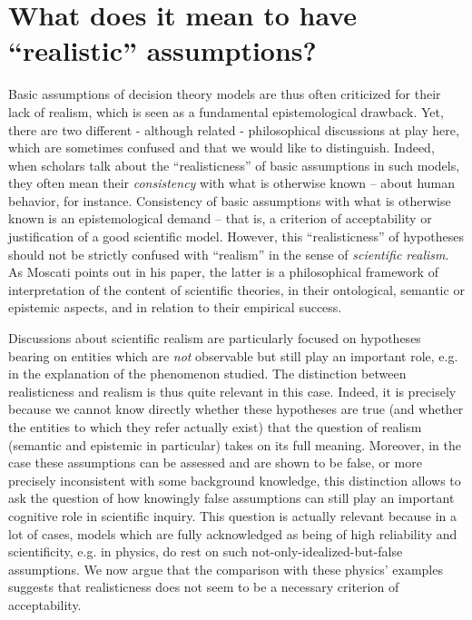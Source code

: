 \documentclass[a4paper,11pt]{article}
\theoremstyle{definition}
\begin{document}

\section{What does it mean to have ``realistic'' assumptions?}
\label{sec:realisticness}
Basic assumptions of decision theory models are thus often criticized for their lack of realism, which is seen as a fundamental epistemological drawback. Yet, there are two different - although related - philosophical discussions at play here, which are sometimes confused and that we would like to distinguish. Indeed, when scholars talk about the ``realisticness'' of basic assumptions in such models, they often mean their \textit{consistency} with what is otherwise known -- about human behavior, for instance. Consistency of basic assumptions with what is otherwise known is an epistemological demand -- that is, a criterion of acceptability or justification of a good scientific model. However, this ``realisticness'' of hypotheses should not be strictly confused with ``realism'' in the sense of \textit{scientific realism}. As Moscati points out in his paper, the latter is a philosophical framework of interpretation of the content of scientific theories, in their ontological, semantic or epistemic aspects, and in relation to their empirical success. 

Discussions about scientific realism are particularly focused on hypotheses bearing on entities which are \textit{not} observable but still play an important role, e.g. in the explanation of the phenomenon studied. The distinction between realisticness and realism is thus quite relevant in this case. Indeed, it is precisely because we cannot know directly whether these hypotheses are true (and whether the entities to which they refer actually exist) that the question of realism (semantic and epistemic in particular) takes on its full meaning. Moreover, in the case these assumptions can be assessed and are shown to be false, or more precisely inconsistent with some background knowledge, this distinction allows to ask the question of how knowingly false assumptions can still play an important cognitive role in scientific inquiry. This question is actually relevant because in a lot of cases, models which are fully acknowledged as being of high reliability and scientificity, e.g. in physics, do rest on such not-only-idealized-but-false assumptions. We now argue that the comparison with these physics’ examples suggests that realisticness does not seem to be a necessary criterion of acceptability.
\end{document}
